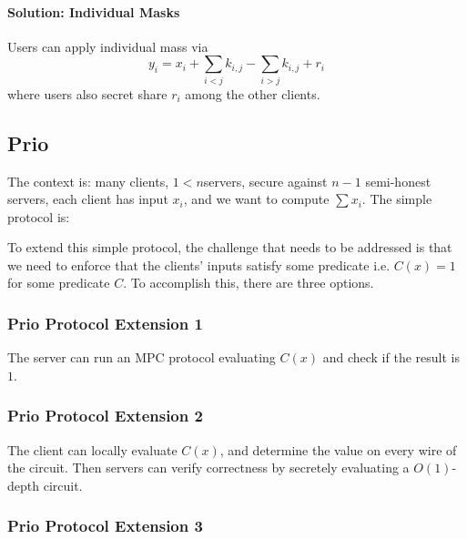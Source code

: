 \paragraph{Solution: Individual Masks}
Users can apply individual mass via
\[
    y_i = x_i + \sum_{i < j} k_{i,j} - \sum_{i > j} k_{i,j} + r_i
\]
where users also secret share $r_i$ among the other clients.


\subsection{Prio}

\begin{prcl}[Prio]
The context is: many clients, $1 < n$servers, secure against $n-1$ semi-honest servers, each client has input $x_i$, and we want to compute $\sum x_i$.
The simple protocol is:
\end{prcl}

To extend this simple protocol, 
the challenge that needs to be addressed is that we need to enforce that the clients' inputs satisfy some predicate i.e. $C(x) = 1$ for some predicate $C$.
To accomplish this, there are three options.

\subsubsection{Prio Protocol Extension 1}
The server can run an MPC protocol evaluating $C(x)$ and check if the result is $1$.

\subsubsection{Prio Protocol Extension 2}
The client can locally evaluate $C(x)$, and determine the value on every wire of the circuit. Then servers can verify correctness by secretely evaluating a $O(1)$-depth circuit.

\subsubsection{Prio Protocol Extension 3}

